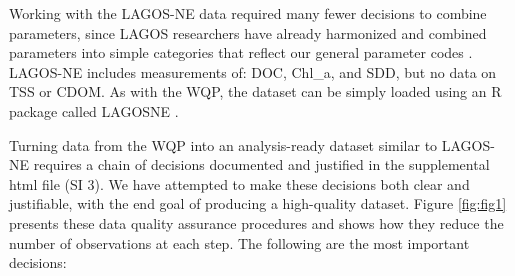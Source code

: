 \documentclass[]{agujournal2018}
\begin{document}
Working with the LAGOS-NE data required many fewer decisions to combine
parameters, since LAGOS researchers have already harmonized and combined
parameters into simple categories that reflect our general parameter
codes \citep{Soranno2015,Soranno2017}. LAGOS-NE includes measurements
of: DOC, Chl\_a, and SDD, but no data on TSS or CDOM. As with the WQP,
the dataset can be simply loaded using an R package called LAGOSNE
\citep{Soranno2017}.

Turning data from the WQP into an analysis-ready dataset similar to
LAGOS-NE requires a chain of decisions documented and justified in the
supplemental html file (SI 3). We have attempted to make these decisions
both clear and justifiable, with the end goal of producing a
high-quality dataset. Figure \ref{fig:fig1} presents these data quality
assurance procedures and shows how they reduce the number of
observations at each step. The following are the most important
decisions:
\end{document}
